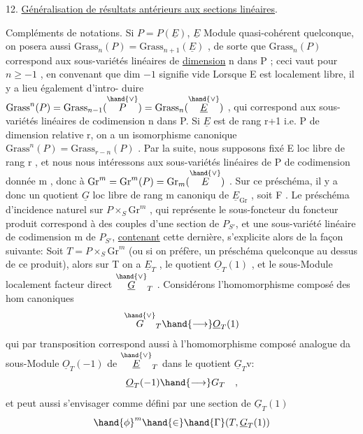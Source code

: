 
12. \uline{Généralisation de résultats antérieurs aux sections linéaires}.

Compléments de notations. Si $P = P(\underline{E})$, $\underline{E}$ Module quasi-cohérent
quelconque, on posera aussi $\mathrm{Grass}_n(P) = \mathrm{Grass}_{n+1}(\underline{E})$ , de sorte que
$\mathrm{Grass}_n(P)$ correspond aux sous-variétés linéaires de \uline{dimension} n dans
P ; ceci vaut pour $n \geq -1$ , en convenant que dim $-1$ signifie vide
Lorsque E est localement libre,  il y a lieu également d'intro-%
duire $\mathrm{Grass}^n(P) = \mathrm{Grass}_{n-1}(\overset{\hand{\vee}}{P}) = \mathrm{Grass}_n(\overset{\hand{\vee}}{\underline{E}})$ , qui correspond aux sous-%
variétés linéaires de codimension n dans P. Si $\underline{E}$ est de rang r+1 i.e.
P de dimension relative r, on a un isomorphisme canonique
$\mathrm{Grass}^n(P) = \mathrm{Grass}_{r-n}(P)$ . Par la suite, nous supposons fixé E loc
libre de rang r , et nous nous intéressons aux sous-variétés linéaires
de P de codimension donnée m , donc à $\mathrm{Gr}^m = \mathrm{Gr}^m(P) = \mathrm{Gr}_{m}(\overset{\hand{\vee}}{E})$ .
Sur ce préschéma, il y a donc un quotient $\underline{G}$ loc libre de rang m canoniqu
de $\underline{E}_{\mathrm{Gr}}$ , soit F .  Le préschéma d'incidence naturel
sur $P\times_S \mathrm{Gr}^m$ , qui représente le sous-foncteur du foncteur produit
correspond à des couples d'une section de $P_{S'}$, et une sous-variété
linéaire de codimension m de $P_{S'}$, \uline{contenant} cette dernière, s'explicite
alors de la façon suivante: Soit $T=P\times_S \mathrm{Gr}^m$ (ou si on préfère, un
préschéma quelconque au dessus de ce produit), alors sur  T on a
$\underline{E}_T$ , le quotient $\underline{O}_T(1)$ , et le sous-Module localement facteur direct
$\overset{\hand{\vee}}{\underline{G}}_T$ . Considérons l'homomorphisme composé des hom canoniques
\[ \overset{\hand{\vee}}{G}_T \hand{\longrightarrow} \underline{O}_T(1) \]
qui par transposition correspond aussi à l'homomorphisme composé
analogue da sous-Module $\underline{O}_T(-1)$ de $\overset{\hand{\vee}}{\underline{E}}_T$ dans le quotient $\underline{G}_T\mathrm{v}$:
\[ \underline{O}_T(-1) \hand{\longrightarrow} G_T \quad , \]
et peut aussi s'envisager comme défini par une section de $\underline{G}_T(1)$
\[ \hand{\phi}^m \hand{\in} \hand{\Gamma}(T, \underline{G}_T(1)) \]


